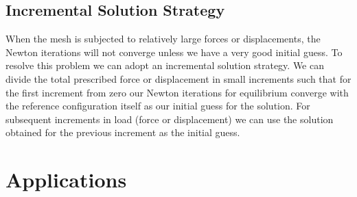 \documentclass[../main.tex]{subfiles}
\begin{document}
\subsection{Incremental Solution Strategy}
When the mesh is subjected to relatively large forces or
displacements, the Newton iterations will not converge unless we have
a very good initial guess. To resolve this problem we can adopt an
incremental solution strategy. We can divide the total prescribed
force or displacement in small increments such that for the first
increment from zero our Newton iterations for equilibrium converge
with the reference configuration itself as our initial guess for the
solution. For subsequent increments in load (force or displacement) we
can use the solution obtained for the previous increment as the
initial guess.

\section{Applications}
\end{document}
